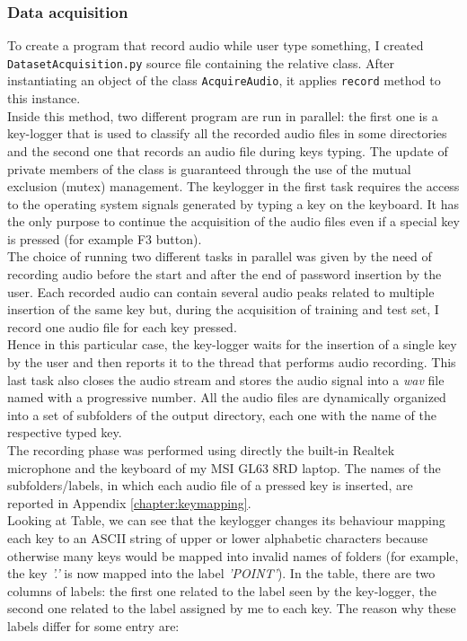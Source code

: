 \subsubsection{Data acquisition}
To create a program that record audio while user type something, I created \texttt{DatasetAcquisition.py} source file containing the relative class. After instantiating an object of the class \texttt{AcquireAudio}, it applies \texttt{record} method to this instance.\\
Inside this method, two different program are run in parallel: the first one is a key-logger that is used to classify all the recorded audio files in some directories and the second one that records an audio file during keys typing. The update of private members of the class is guaranteed through the use of the mutual exclusion (mutex) management. The keylogger in the first task requires the access to the operating system signals generated by typing a key on the keyboard. It has the only purpose to continue the acquisition of the audio files even if a special key is pressed (for example F3 button).\\
The choice of running two different tasks in parallel was given by the need of recording audio before the start and after the end of password insertion by the user. Each recorded audio can contain several audio peaks related to multiple insertion of the same key but, during the acquisition of training and test set, I record one audio file for each key pressed.\\
Hence in this particular case, the key-logger waits for the insertion of a single key by the user and then reports it to the thread that performs audio recording. This last task also closes the audio stream and stores the audio signal into a \textit{wav} file named with a progressive number. All the audio files are dynamically organized into a set of subfolders of the output directory, each one with the name of the respective typed key.\\
The recording phase was performed using directly the built-in Realtek microphone and the keyboard of my MSI GL63 8RD laptop. The names of the subfolders/labels, in which each audio file of a pressed key is inserted, are reported in Appendix \ref{chapter:keymapping}.\\
Looking at Table, we can see that the keylogger changes its behaviour mapping each key to an ASCII string of upper or lower alphabetic characters because otherwise many keys would be mapped into invalid names of folders (for example, the key \textit{'.'} is now mapped into the label \textit{'POINT'}). In the table, there are two columns of labels: the first one related to the label seen by the key-logger, the second one related to the label assigned by me to each key. The reason why these labels differ for some entry are:
